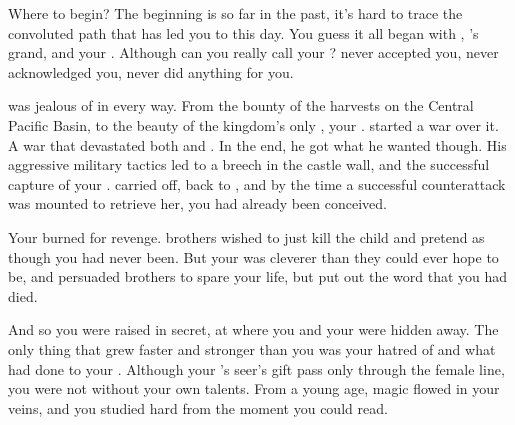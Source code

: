 \documentclass[char]{NeptuneBall}
\begin{document}
\name{\cManta{}}


Where to begin? The beginning is so far in the past, it's hard to trace the convoluted path that has led you to this day. You guess it all began with \cExExKing{\King} \cExExKing{}, \cExExKing{\King} \cKing{}'s grand\cExExKing{\parent}, and your \cExExKing{\parent}. Although can you really call \cExExKing{\them} your \cExExKing{\parent}? \cExExKing{\They} never accepted you, never acknowledged you, never did anything for you.

\cExExKing{\They} was jealous of \pPacifica{} in every way. From the bounty of the harvests on the Central Pacific Basin, to the beauty of the kingdom's only \cMother{\prince}, your \cMother{\parent} \cMother{\MYname}. \cExExKing{} started a war over it. A war that devastated both \pPacifica{} and \pAtlantis{}. In the end, he got what he wanted though. His aggressive military tactics led to a breech in the castle wall, and the successful capture of your \cMother{\parent}. \cExExKing{} carried \cMother{\them} off, back to \pAtlantis{}, and by the time a successful counterattack was mounted to retrieve her, you had already been conceived.

Your \cMother{\parent} burned for revenge. \cMother{\Them} brothers wished to just kill the child and pretend as though you had never been. But your \cMother{\parent} was cleverer than they could ever hope to be, and persuaded \cMother{\them} brothers to spare your life, but put out the word that you had died.

And so you were raised in secret, at \pAssassin{} where you and your \cMother{\parent} were hidden away. The only thing that grew faster and stronger than you was your hatred of \pAtlantis{} and what \cExExKing{} had done to your \cMother{\parent}. Although your \cMother{\parent}'s seer's gift pass only through the female line, you were not without your own talents. From a young age, magic flowed in your veins, and you studied hard from the moment you could read.
\end{document}
